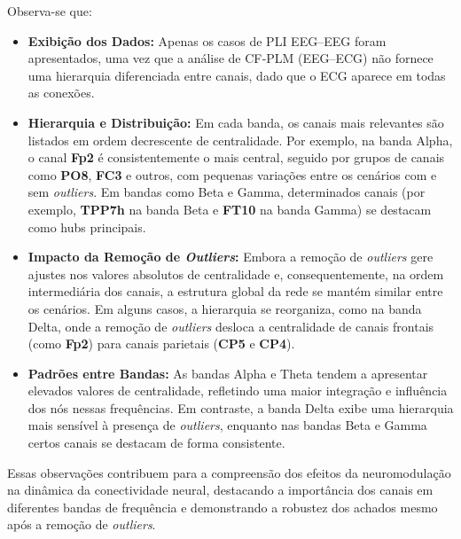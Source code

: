 Observa-se que:
\begin{itemize}
    \item \textbf{Exibição dos Dados:} Apenas os casos de PLI EEG–EEG foram apresentados, uma vez que a análise de CF‐PLM (EEG–ECG) não fornece uma hierarquia diferenciada entre canais, dado que o ECG aparece em todas as conexões.
    \item \textbf{Hierarquia e Distribuição:} Em cada banda, os canais mais relevantes são listados em ordem decrescente de centralidade. Por exemplo, na banda Alpha, o canal \textbf{Fp2} é consistentemente o mais central, seguido por grupos de canais como \textbf{PO8}, \textbf{FC3} e outros, com pequenas variações entre os cenários com e sem \textit{outliers}. Em bandas como Beta e Gamma, determinados canais (por exemplo, \textbf{TPP7h} na banda Beta e \textbf{FT10} na banda Gamma) se destacam como hubs principais.
    \item \textbf{Impacto da Remoção de \textit{Outliers}:} Embora a remoção de \textit{outliers} gere ajustes nos valores absolutos de centralidade e, consequentemente, na ordem intermediária dos canais, a estrutura global da rede se mantém similar entre os cenários. Em alguns casos, a hierarquia se reorganiza, como na banda Delta, onde a remoção de \textit{outliers} desloca a centralidade de canais frontais (como \textbf{Fp2}) para canais parietais (\textbf{CP5} e \textbf{CP4}).
    \item \textbf{Padrões entre Bandas:} As bandas Alpha e Theta tendem a apresentar elevados valores de centralidade, refletindo uma maior integração e influência dos nós nessas frequências. Em contraste, a banda Delta exibe uma hierarquia mais sensível à presença de \textit{outliers}, enquanto nas bandas Beta e Gamma certos canais se destacam de forma consistente.
\end{itemize}

Essas observações contribuem para a compreensão dos efeitos da neuromodulação na dinâmica da conectividade neural, destacando a importância dos canais em diferentes bandas de frequência e demonstrando a robustez dos achados mesmo após a remoção de \textit{outliers}.
